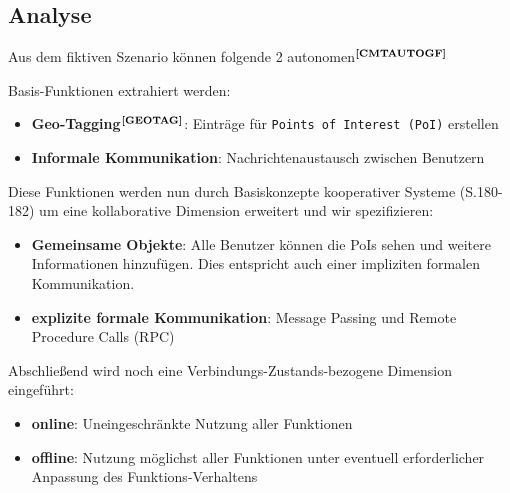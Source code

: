\subsection{Analyse}\label{2_VOYAGEX}
Aus dem fiktiven Szenario können folgende 2 autonomen$^{\textbf{\ref{CMTAUTOGF}}}$%
\addtocounter{footnote}{1}%
 Basis-Funktionen
extrahiert
werden:
\enlargethispage{3\baselineskip} %
\begin{itemize}[leftmargin=*,noitemsep,topsep=1ex,parsep=0pt,partopsep=0pt]
\item \textbf{Geo-Tagging}$^{\textbf{\ref{GEOTAG}}}$: Einträge für \texttt{Points of Interest (PoI)} erstellen
\item \textbf{Informale Kommunikation}: Nachrichtenaustausch zwischen Benutzern
\end{itemize}
Diese Funktionen werden nun durch Basiskonzepte kooperativer Systeme\cite{K1678:VERTSYS} (S.180-182) um eine kollaborative Dimension erweitert und wir spezifizieren:
\begin{itemize}[leftmargin=*,noitemsep,topsep=1ex,parsep=0pt,partopsep=0pt]
\item \textbf{Gemeinsame Objekte}: Alle Benutzer können die PoIs sehen und weitere Informationen hinzufügen. Dies entspricht auch einer impliziten formalen Kommunikation.
\item \textbf{explizite formale Kommunikation}: Message Passing und Remote Procedure Calls (RPC)
\end{itemize}
Abschließend wird noch eine Verbindungs-Zustands-bezogene Dimension eingeführt:
\begin{itemize}[leftmargin=*,noitemsep,topsep=1ex,parsep=0pt,partopsep=0pt]
\item \textbf{online}: Uneingeschränkte Nutzung aller Funktionen
\item \textbf{offline}: Nutzung möglichst aller Funktionen unter eventuell erforderlicher Anpassung des Funktions-Verhaltens
\end{itemize}
